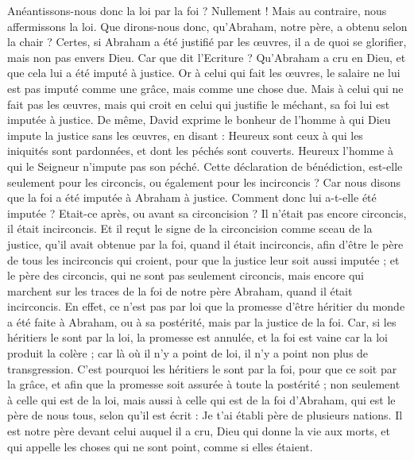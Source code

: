 \begin{multicols}{2}
Anéantissons-nous donc la loi par la foi ? Nullement ! Mais au contraire, nous affermissons la loi.
\VerseOne{}Que dirons-nous donc, qu'Abraham, notre père, a obtenu selon la chair ?
Certes, si Abraham a été justifié par les œuvres, il a de quoi se glorifier, mais non pas envers Dieu.
Car que dit l'Ecriture ? Qu’Abraham a cru en Dieu, et que cela lui a été imputé à justice.
Or à celui qui fait les œuvres, le salaire ne lui est pas imputé comme une grâce, mais comme une chose due.
Mais à celui qui ne fait pas les œuvres, mais qui croit en celui qui justifie le méchant, sa foi lui est imputée à justice.
De même, David exprime le bonheur de l'homme à qui Dieu impute la justice sans les œuvres, en disant :
Heureux sont ceux à qui les iniquités sont pardonnées, et dont les péchés sont couverts.
Heureux l'homme à qui le Seigneur n’impute pas son péché.
Cette déclaration de bénédiction, est-elle seulement pour les circoncis, ou également pour les incirconcis ? Car nous disons que la foi a été imputée à Abraham à justice.
Comment donc lui a-t-elle été imputée ? Etait-ce après, ou avant sa circoncision ? Il n’était pas encore circoncis, il était incirconcis.
Et il reçut le signe de la circoncision comme sceau de la justice, qu’il avait obtenue par la foi, quand il était incirconcis, afin d’être le père de tous les incirconcis qui croient, pour que la justice leur soit aussi imputée ;
et le père des circoncis, qui ne sont pas seulement circoncis, mais encore qui marchent sur les traces de la foi de notre père Abraham, quand il était incirconcis.
En effet, ce n’est pas par loi que la promesse d'être héritier du monde a été faite à Abraham, ou à sa postérité, mais par la justice de la foi.
Car, si les héritiers le sont par la loi, la promesse est annulée, et la foi est vaine
car la loi produit la colère ; car là où il n'y a point de loi, il n'y a point non plus de transgression.
C'est pourquoi les héritiers le sont par la foi, pour que ce soit par la grâce, et afin que la promesse soit assurée à toute la postérité ; non seulement à celle qui est de la loi, mais aussi à celle qui est de la foi d'Abraham, qui est le père de nous tous,
selon qu'il est écrit : Je t'ai établi père de plusieurs nations. Il est notre père devant celui auquel il a cru, Dieu qui donne la vie aux morts, et qui appelle les choses qui ne sont point, comme si elles étaient.

\end{multicols}
